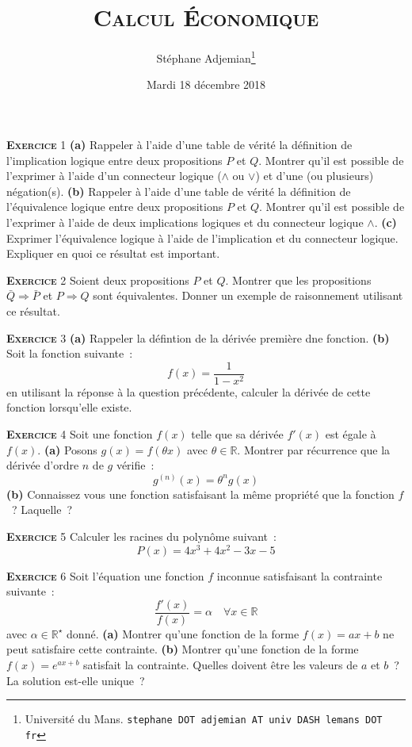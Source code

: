 \documentclass[10pt,a4paper,notitlepage,twocolumn]{article}
\newcommand{\exercise}[1]{\textsc{\textbf{Exercice}} #1}
\newcommand{\question}[1]{\textbf{(#1)}}
\begin{document}
\title{\textsc{Calcul Économique}}
\author{Stéphane Adjemian\thanks{Université du Mans. \texttt{stephane DOT adjemian AT univ DASH lemans DOT fr}}}
\date{Mardi 18 décembre 2018}

\maketitle
\thispagestyle{empty}

\exercise{1} \question{a} Rappeler à l'aide d'une table de vérité la
définition de l'implication logique entre deux propositions $P$ et
$Q$. Montrer qu'il est possible de l'exprimer à l'aide d'un connecteur
logique ($\land$ ou $\lor$) et d'une (ou plusieurs)
négation(s). \question{b} Rappeler à l'aide d'une table de vérité la
définition de l'équivalence logique entre deux propositions $P$ et
$Q$. Montrer qu'il est possible de l'exprimer à l'aide de deux
implications logiques et du connecteur logique $\land$. \question{c}
Exprimer l'équivalence logique à l'aide de l'implication et du
connecteur logique. Expliquer en quoi ce résultat est important.

\bigskip
  
\exercise{2} Soient deux propositions $P$ et $Q$. Montrer que les
propositions $\bar Q \Rightarrow \bar P$ et $P \Rightarrow Q$ sont
équivalentes. Donner un exemple de raisonnement utilisant ce résultat.

\bigskip

\exercise{3} \question{a} Rappeler la défintion de la dérivée première
dne fonction. \question{b} Soit la fonction suivante :
\[
f(x) = \frac{1}{1-x^2}
\]
en utilisant la réponse à la question précédente, calculer la dérivée
de cette fonction lorsqu'elle existe.

\bigskip

\exercise{4} Soit une fonction $f(x)$ telle que sa dérivée $f'(x)$ est
égale à $f(x)$. \question{a} Posons $g(x) = f(\theta x)$ avec
$\theta\in\mathbb R$. Montrer par récurrence que la dérivée d'ordre
$n$ de $g$ vérifie :
\[
g^{(n)}(x) = \theta^{n}g(x)
\]
\question{b} Connaissez vous une fonction satisfaisant la même
propriété que la fonction $f$ ? Laquelle ?

\bigskip

\exercise{5} Calculer les racines du polynôme suivant : 
\[
P(x) = 4x^3+4x^2-3x-5
\]

\bigskip

\exercise{6} Soit l'équation une fonction $f$ inconnue satisfaisant la contrainte suivante :
\[
\frac{f'(x)}{f(x)} = \alpha\quad \forall x\in \mathbb R
\]
avec $\alpha\in\mathbb R^{\star}$ donné. \question{a} Montrer qu'une
fonction de la forme $f(x) = ax+b$ ne peut satisfaire cette
contrainte. \question{b} Montrer qu'une fonction de la forme
$f(x)=e^{ax+b}$ satisfait la contrainte. Quelles doivent être les valeurs de
$a$ et $b$ ? La solution est-elle unique ?
\end{document}
